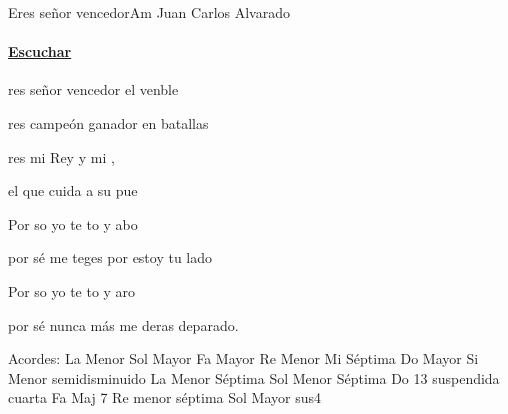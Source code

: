 \documentclass[12pt, spanish]{book}
\begin{document}
    \begin{song}{Eres señor vencedor}{Am}
    {} %
    {Juan Carlos Alvarado}
    {} %
    {}
        \ifChordBk
        \paragraph{\mbox{}\hfill\protect\href{https://open.spotify.com/intl-es/track/3T56QpufAmXo4Y29o8Bsgw}{Escuchar}\mbox{}\hfill}
        \fi


        \begin{SBOpGroup}
            res señor vencedor el venble

            res campeón ganador en batallas

            res mi Rey y mi ,

            el que cuida a su pue
        \end{SBOpGroup}

        \begin{SBChorus}
            Por so yo te to y  abo

            por sé   me teges por estoy  tu lado

            Por so yo te to y  aro

            por sé   nunca más me deras deparado.
        \end{SBChorus}

        \ifChordBk
        \begin{SBOpGroup}
            Acordes:\break
            \upchord{\Am}\qquad La Menor \hfill
            \upchord{\G}\qquad Sol Mayor \hfill\null\break
            \upchord{\F}\qquad Fa Mayor \hfill
            \upchord{\Dm}\qquad Re Menor \hfill\null\break
            \upchord{\Eseven}\qquad Mi S\'eptima \hfill
            \upchord{\C}\qquad Do Mayor \hfill\null\break
            \upchord{\Bmsevenbfive}\qquad Si Menor semidisminuido \hfill
            \upchord{\Amseven}\qquad La Menor S\'eptima \hfill\null\break
            \upchord{\Gmseven}\qquad Sol Menor S\'eptima \hfill
            \upchord{\Csusthirteen}\qquad Do 13 suspendida cuarta \hfill\null\break
            \upchord{\FMaj}\qquad Fa Maj 7 \hfill
            \upchord{\Dmseven}Re menor s\'eptima \hfill\null\break
            \upchord{\Gsus}\qquad Sol Mayor sus4 \hfill
        \end{SBOpGroup}
        \fi
    \end{song}
\end{document}
